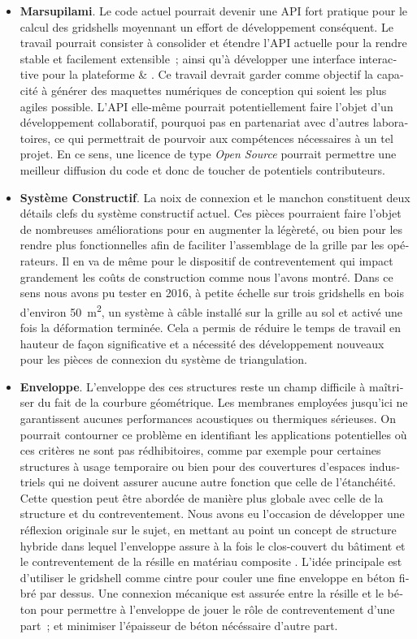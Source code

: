 \begin{otherlanguage}{french}
\begin{itemize}
\item 
    \textbf{Marsupilami}. Le code actuel pourrait devenir une API \Csharp{} fort pratique pour le calcul des gridshells moyennant un effort de développement conséquent. Le travail pourrait consister à consolider et étendre l'API actuelle pour la rendre stable et facilement extensible~; ainsi qu'à développer une interface interactive pour la plateforme \rhino{} \& \grasshopper{}. Ce travail devrait garder comme objectif la capacité à générer des maquettes numériques de conception qui soient les plus agiles possible. L'API elle-même pourrait potentiellement faire l'objet d'un développement collaboratif, pourquoi pas en partenariat avec d'autres laboratoires, ce qui permettrait de pourvoir aux compétences nécessaires à un tel projet. En ce sens, une licence de type \emph{Open Source} pourrait permettre une meilleur diffusion du code et donc de toucher de potentiels contributeurs.
    
\item 
    \textbf{Système Constructif}. La noix de connexion et le manchon constituent deux détails clefs du système constructif actuel. Ces pièces pourraient faire l'objet de nombreuses améliorations pour en augmenter la légèreté, ou bien pour les rendre plus fonctionnelles afin de faciliter l'assemblage de la grille par les opérateurs. Il en va de même pour le dispositif de contreventement qui impact grandement les coûts de construction comme nous l'avons montré. Dans ce sens nous avons pu tester en 2016, à petite échelle sur trois gridshells en bois d'environ \SI{50}{m^2}, un système à câble installé sur la grille au sol et activé une fois la déformation terminée. Cela a permis de réduire le temps de travail en hauteur de façon significative et a nécessité des développement nouveaux pour les pièces de connexion du système de triangulation.

\item 
    \textbf{Enveloppe}. L'enveloppe des ces structures reste un champ difficile à maîtriser du fait de la courbure géométrique. Les membranes employées jusqu'ici ne garantissent aucunes performances acoustiques ou thermiques sérieuses. On pourrait contourner ce problème en identifiant les applications potentielles où ces critères ne sont pas rédhibitoires, comme par exemple pour certaines structures à usage temporaire ou bien pour des couvertures d'espaces industriels qui ne doivent assurer aucune autre fonction que celle de l'étanchéité. Cette question peut être abordée de manière plus globale avec celle de la structure et du contreventement. Nous avons eu l'occasion de développer une réflexion originale sur le sujet, en mettant au point un concept de structure hybride dans lequel l'enveloppe assure à la fois le clos-couvert du bâtiment et le contreventement de la résille en matériau composite \cite{Cuvilliers2017}. L'idée principale est d'utiliser le gridshell comme cintre pour couler une fine enveloppe en béton fibré par dessus. Une connexion mécanique est assurée entre la résille et le béton pour permettre à l'enveloppe de jouer le rôle de contreventement d'une part~; et minimiser l'épaisseur de béton nécéssaire d'autre part.
    

\end{itemize}
\end{otherlanguage}
